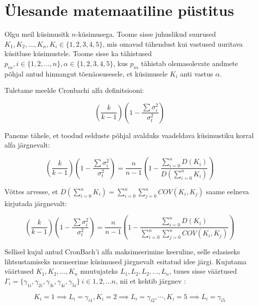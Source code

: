 \documentclass[a4paper]{article}
\begin{document}
\section*{\"Ulesande matemaatiline p\"ustitus}

Olgu meil k\"usimusitk $n$-k\"usimusega. Toome sisse juhuslikud suurused $K_1,K_2,...,K_n, K_i \in \{1,2,3,4,5\}$, mis omavad tähendust kui vastused uuritava k\"usitluse k\"usimustele. Toome sisse ka tähistused $p_{i \alpha}, i \in \{1,2,...,n\}, \alpha \in \{1,2,3,4,5\}$, kus $p_{i \alpha}$ tähistab olemasolevate andmete põhjal antud hinnangut tõenäosusesele, et k\"usimusele $K_i$ anti vastus $\alpha$. 

Tuletame meelde Cronbachi alfa definitsiooni:


\begin{equation*}
(\frac{k}{k-1})( 1 - \frac{\sum \sigma_i^2}{\sigma_t^2})
\end{equation*}

Paneme tähele, et toodud eelduste põhjal avalduks vaadeldava k\"usimustiku korral alfa järgnevalt:

 
\begin{equation*}
(\frac{k}{k-1})( 1 - \frac{\sum \sigma_i^2}{\sigma_t^2}) = \frac{n}{n-1}\left(1 - \frac
{\sum \limits_{i=0}^n D(K_i)}{D(\sum \limits_{i=0}^n K_i)}\right)
\end{equation*}

Võttes arvesse, et $D(\sum \limits_{i=0}^n K_i) = \sum \limits_{i=0}^n \sum \limits_{j=0}^n COV(K_i,K_j)$ saame eelneva kirjutada järgnevalt:

\begin{equation*}
(\frac{k}{k-1})( 1 - \frac{\sum \sigma_i^2}{\sigma_t^2}) = \frac{n}{n-1}\left(1 - \frac
{\sum \limits_{i=0}^n D(K_i)}{\sum \limits_{i=0}^n \sum \limits_{j=0}^n COV(K_i,K_j)}\right)
\end{equation*}

Sellisel kujul antud CronBach'i alfa maksimeerimine keeruline, selle edasiseks lihtsustamiseks normeerime k\"usimused järgnevalt esitatud idee järgi.
Kujutama väärtused $K_1,K_2,...,K_n$ muutujateks  $L_1, L_2,L_2,...,L_n$, tuues sisse väärtused $\Gamma_i = \{\gamma_{1i},\gamma_{2i},\gamma_{3i},\gamma_{4i},\gamma_{5i}\} ~ i \in {1,2,...n}$, nii et kehtib järgnev : 

\begin{equation*}
K_i = 1 \implies L_i = \gamma_{i1}, K_i = 2 \implies L_i = \gamma_{i2},\cdots, K_i = 5 \implies L_i =\gamma_{i5}
\end{equation*}
\end{document}
